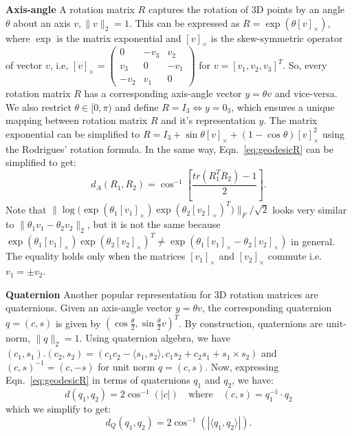 \documentclass[10pt,twocolumn,letterpaper]{article}
\newcommand{\myparagraph}[1]{\smallskip\noindent\textbf{#1}}
\begin{document}
	\myparagraph{Axis-angle} A rotation matrix $R$ captures the rotation of 3D points by an angle 
	$\theta$ about an axis $v, \|v\|_2=1$. This can be expressed as $R = \exp(\theta [v]_{\times})$, where $\exp$ is the matrix exponential and $[v]_\times$ is the skew-symmetric operator of vector $v$, i.e, $[v]_\times = \begin{pmatrix}
	0 & -v_3 & v_2 \\ v_3 & 0 & -v_1 \\ -v_2 & v_1 & 0 
	\end{pmatrix}$ for $v = [v_1, v_2, v_3]^T$. So, every rotation matrix $R$ has a corresponding 
	axis-angle vector $y = \theta v$ and vice-versa. We also restrict $\theta \in [0, \pi)$ and 
	define $R=I_3 \Leftrightarrow y=0_3$, which ensures a unique mapping between rotation matrix $R$ and it's representation $y$. The matrix exponential can be simplified to $R = I_3 + 
	\sin \theta [v]_\times + (1 - \cos \theta) [v]_\times^2$ using the Rodrigues' rotation formula. 
	In the same way, Eqn.~\eqref{eq:geodesicR} can be simplified to get: 
	\begin{equation}
	d_A(R_1, R_2) = \cos^{-1} \left[ \frac{tr(R_1^T R_2) - 1}{2} \right] .
	\label{eq:distR}
	\end{equation}
	Note that $\| \log \big (\exp (\theta_1 [v_1]_\times) \exp (\theta_2 [v_2]_\times)^T \big ) \|_F / 
	\sqrt{2}$ looks very similar to $\|\theta_1 v_1 - \theta_2 v_2\|_2$, but it is not the same 
	because $\exp(\theta_1 [v_1]_\times) \exp(\theta_2 [v_2]_\times)^T \neq \exp(\theta_1 [v_1]_\times - \theta_2 [v_2]_\times) $ in general. The equality holds only when the matrices $[v_1]_\times$ and $[v_2]_\times$ commute i.e. $v_1 = \pm v_2$.
	
	\myparagraph{Quaternion} Another popular representation for 3D rotation matrices are 
	quaternions. Given an axis-angle vector $y = \theta v$, the corresponding quaternion $q = (c, s)$ is given by $(\cos \frac{\theta}{2}, \sin \frac{\theta}{2} v)^T$. By construction, quaternions are unit-norm, $\|q\|_2=1$. Using quaternion algebra, we have $(c_1, s_1).(c_2, s_2) = (c_1c_2- \langle s_1, s_2 \rangle, c_1 s_2+c_2 s_1+s_1 \times s_2)$ and $(c, s)^{-1} = (c, -s)$ for unit norm $q=(c, s)$. Now, expressing Eqn.~\eqref{eq:geodesicR} in terms of quaternions $q_1$ and $q_2$, we have:
	\begin{equation}
	d(q_1, q_2) = 2 \cos^{-1}(|c|) \hspace{1em} \text{where} \hspace{1em} (c, s) = q_1^{-1} \cdot q_2
	\end{equation}
	which we simplify to get:
	\begin{equation}
	d_Q(q_1, q_2) = 2 \cos^{-1}(| \langle q_1, q_2 \rangle|) .
	\label{eq:distQ}
	\end{equation}
	
\end{document}
